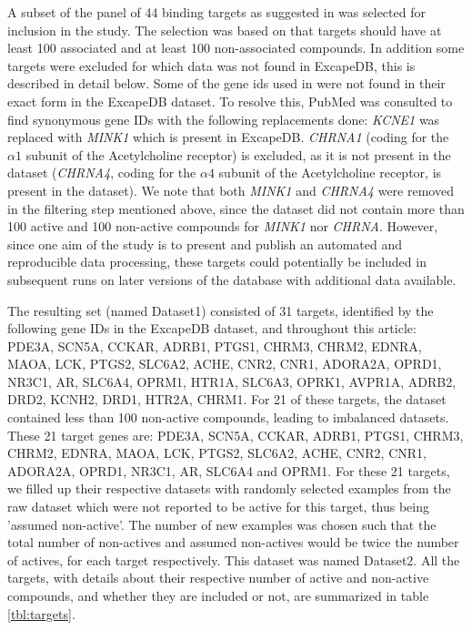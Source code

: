 \documentclass[10pt,article]{memoir}
\begin{document}
A subset of the panel of 44 binding targets as suggested in \cite{Bowes2012}
was selected for inclusion in the study. The selection was based on that targets
should have at least 100 associated and at least 100 non-associated compounds. 
In addition some targets were excluded for which data was not found in ExcapeDB, this is described in detail below.
%
Some of the gene ids used in \cite{Bowes2012} were not found in their exact
form in the ExcapeDB dataset. To resolve this, PubMed was consulted to find
synonymous gene IDs with the following replacements done:
%
\textit{KCNE1} was replaced with \textit{MINK1} which is present in ExcapeDB.
\textit{CHRNA1} (coding for the $\alpha1$ subunit of the Acetylcholine
receptor) is excluded, as it is not present in the dataset (\textit{CHRNA4},
coding for the $\alpha4$ subunit of the Acetylcholine receptor, is present in
the dataset). We note that both \textit{MINK1} and \textit{CHRNA4} were removed in the filtering
step mentioned above, since the dataset did not contain more than 100 active
and 100 non-active compounds for \textit{MINK1} nor \textit{CHRNA}. 
However, since one aim of the study is to present and publish an automated and reproducible data processing, these targets could potentially be included in subsequent runs on later versions of the database with additional data available.

The resulting set (named Dataset1) consisted of 31 targets, identified by the following gene
IDs in the ExcapeDB dataset, and throughout this article:
%
PDE3A, SCN5A, CCKAR, ADRB1, PTGS1, CHRM3, CHRM2, EDNRA, MAOA, LCK, PTGS2,
SLC6A2, ACHE, CNR2, CNR1, ADORA2A, OPRD1, NR3C1, AR, SLC6A4, OPRM1, HTR1A,
SLC6A3, OPRK1, AVPR1A, ADRB2, DRD2, KCNH2, DRD1, HTR2A, CHRM1.
%
For 21 of these targets, the dataset contained less than 100 non-active
compounds, leading to imbalanced datasets. These 21 target genes are: PDE3A,
SCN5A, CCKAR, ADRB1, PTGS1, CHRM3, CHRM2, EDNRA, MAOA, LCK, PTGS2, SLC6A2,
ACHE, CNR2, CNR1, ADORA2A, OPRD1, NR3C1, AR, SLC6A4 and OPRM1.
%
For these 21 targets, we filled up their respective datasets with randomly
selected examples from the raw dataset which were not reported to be active for
this target, thus being 'assumed non-active'. The number of new examples was chosen such that the total number of non-actives and
assumed non-actives would be twice the number of actives, for each target
respectively. This dataset was named Dataset2.
%
All the targets, with details about their respective number of active
and non-active compounds, and whether they are included or not, are summarized
in table \ref{tbl:targets}.
\end{document}
